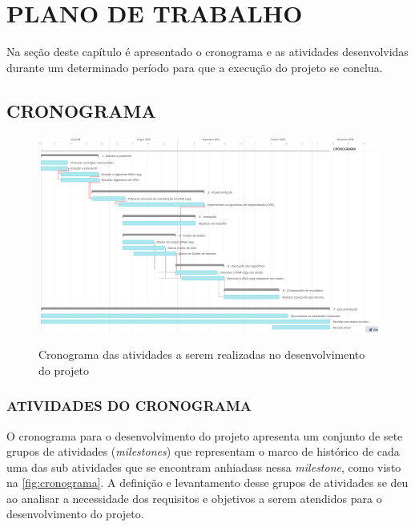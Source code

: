 
\chapter{PLANO DE TRABALHO}
\label{chap:planoDeTrabalho}

Na seção deste capítulo é apresentado o cronograma e as atividades desenvolvidas durante um determinado período para que a execução do projeto se conclua.

\section{CRONOGRAMA}

\begin{figure}[!htb]
    \centering
    \caption{Cronograma das atividades a serem realizadas no desenvolvimento do projeto}
    \includegraphics[width=1\textwidth]{./dados/figuras/cronograma}
    \label{fig:cronograma}
\end{figure}

\subsection{ATIVIDADES DO CRONOGRAMA}

O cronograma para o desenvolvimento do projeto apresenta um conjunto de sete grupos de atividades (\textit{milestones}) que representam o marco de histórico de cada uma das sub atividades que se encontram anhiadass nessa \textit{milestone}, como visto na \autoref{fig:cronograma}. A definição e levantamento desse grupos de atividades se deu ao analisar a necessidade dos requisitos e objetivos a serem atendidos para o desenvolvimento do projeto.


